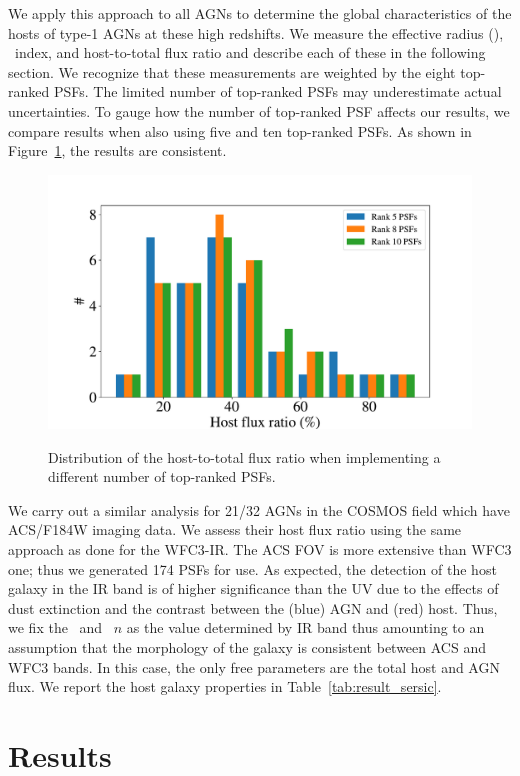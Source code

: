 \documentclass[apj]{emulateapj}
\begin{document}

We apply this approach to all AGNs to determine the global characteristics of the hosts of type-1 AGNs at these high redshifts. We measure the effective radius (\Reff), \sersic\ index, and host-to-total flux ratio and describe each of these in the following section. We recognize that these measurements are weighted by the eight top-ranked PSFs. The limited number of top-ranked PSFs may underestimate actual uncertainties. To gauge how the number of top-ranked PSF affects our results, we compare results when also using five and ten top-ranked PSFs. As shown in Figure~\ref{fig:hist_compare}, the results are consistent.

\begin{figure}
\centering
{
\includegraphics[height=0.25\textwidth]{fig/hist_compare.pdf}
}
\caption{\label{fig:hist_compare} 
Distribution of the host-to-total flux ratio when implementing a different number of top-ranked PSFs.}
\end{figure} 


We carry out a similar analysis for 21/32 AGNs in the COSMOS field which have ACS/F184W imaging data. We assess their host flux ratio using the same approach as done for the WFC3-IR. The ACS FOV is more extensive than WFC3 one; thus we generated 174 PSFs for use. As expected, the detection of the host galaxy in the IR band is of higher significance than the UV due to the effects of dust extinction and the contrast between the (blue) AGN and (red) host. Thus, we fix the \Reff\ and \sersic\ $n$ as the value determined by IR band thus amounting to an assumption that the morphology of the galaxy is consistent between ACS and WFC3 bands. In this case, the only free parameters are the total host and AGN flux. We report the host galaxy properties in Table~\ref{tab:result_sersic}.


\section{Results}
\label{sec:result}
\end{document}
